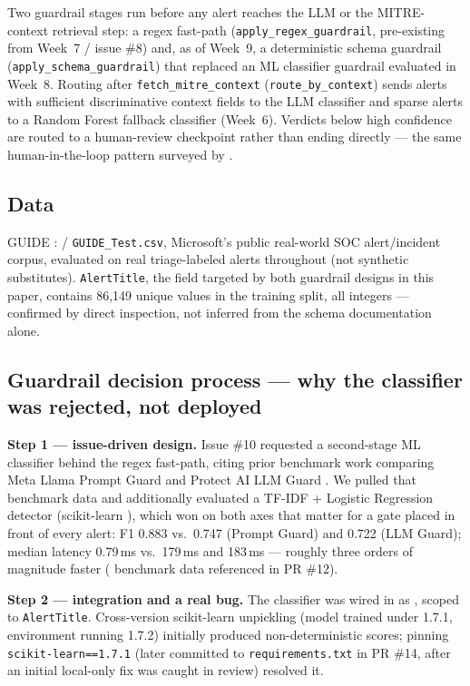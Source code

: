 \documentclass[twocolumn]{svjour3}
\begin{document}
Two guardrail stages run before any alert reaches the LLM or the MITRE-context retrieval step: a regex fast-path (\texttt{apply\_regex\_guardrail}, pre-existing from Week~7 / issue \#8) and, as of Week~9, a deterministic schema guardrail (\texttt{apply\_schema\_guardrail}) that replaced an ML classifier guardrail evaluated in Week~8. Routing after \texttt{fetch\_mitre\_context} (\texttt{route\_by\_context}) sends alerts with sufficient discriminative context fields to the LLM classifier and sparse alerts to a Random Forest fallback classifier (Week~6). Verdicts below high confidence are routed to a human-review checkpoint rather than ending directly --- the same human-in-the-loop pattern surveyed by \cite{srinivas2025survey}.

\subsection{Data}\label{subsec3-2}
GUIDE \cite{guide2024,guide_kaggle2024}:  / \texttt{GUIDE\_Test.csv}, Microsoft's public real-world SOC alert/incident corpus, evaluated on real triage-labeled alerts throughout (not synthetic substitutes). \texttt{AlertTitle}, the field targeted by both guardrail designs in this paper, contains 86{,}149 unique values in the training split, all integers --- confirmed by direct inspection, not inferred from the schema documentation alone.

\subsection{Guardrail decision process --- why the classifier was rejected, not deployed}\label{subsec3-3}

\noindent\textbf{Step 1 --- issue-driven design.} Issue \#10 requested a second-stage ML classifier behind the regex fast-path, citing prior benchmark work comparing Meta Llama Prompt Guard and Protect AI LLM Guard \cite{llamafirewall2025,promptguard2024,llmguard2023}. We pulled that benchmark data and additionally evaluated a TF-IDF + Logistic Regression detector (scikit-learn \cite{pedregosa2011sklearn}), which won on both axes that matter for a gate placed in front of every alert: F1 0.883 vs.\ 0.747 (Prompt Guard) and 0.722 (LLM Guard); median latency 0.79\,ms vs.\ 179\,ms and 183\,ms --- roughly three orders of magnitude faster ( benchmark data referenced in PR \#12).

\noindent\textbf{Step 2 --- integration and a real bug.} The classifier was wired in as , scoped to \texttt{AlertTitle}. Cross-version scikit-learn unpickling (model trained under 1.7.1, environment running 1.7.2) initially produced non-deterministic scores; pinning \texttt{scikit-learn==1.7.1} (later committed to \texttt{requirements.txt} in PR \#14, after an initial local-only fix was caught in review) resolved it.
\end{document}
